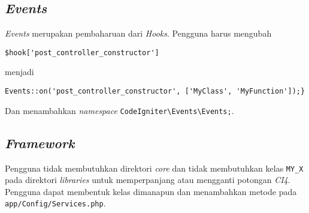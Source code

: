 \subsection{\textit{Events}}
\textit{Events} merupakan pembaharuan dari \textit{Hooks}. Pengguna harus mengubah
\begin{center}
	\verb|$hook['post_controller_constructor']|
\end{center} 
menjadi 
\begin{center} \verb|Events::on('post_controller_constructor', ['MyClass', 'MyFunction']);}|
\end{center}
Dan menambahkan \textit{namespace} \verb|CodeIgniter\Events\Events;|. 

\subsection{\textit{Framework}}
Pengguna tidak membutuhkan direktori \textit{core} dan tidak membutuhkan kelas \verb|MY_X| pada direktori \textit{libraries} untuk memperpanjang atau mengganti potongan \textit{CI4}. Pengguna dapat membentuk kelas dimanapun dan menambahkan metode pada \verb|app/Config/Services.php|.


